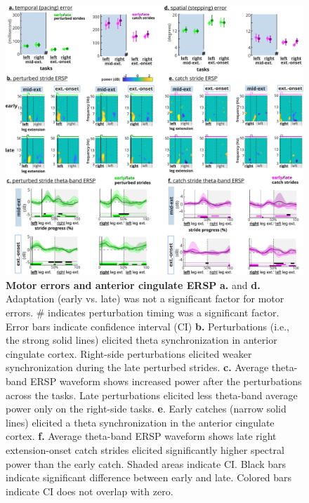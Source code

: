\documentclass[../thesis_seyed.tex]{subfiles}
\begin{document}
\begin{figure}[H]
\centerline{\includegraphics{../img/hyp1and2-fdr.jpg}}
\caption{\textbf{Motor errors and anterior cingulate ERSP} \textbf{a.} and \textbf{d.} Adaptation (early vs. late) was not a significant factor for motor errors. \# indicates perturbation timing was a significant factor. Error bars indicate confidence interval (CI) \textbf{b.} Perturbations (i.e., the strong solid lines) elicited theta synchronization in anterior cingulate cortex. Right-side perturbations elicited weaker synchronization during the late perturbed strides. \textbf{c.} Average theta-band ERSP waveform shows increased power after the perturbations across the tasks. Late perturbations elicited less theta-band average power only on the right-side tasks. \textbf{e}. Early catches (narrow solid lines) elicited a theta synchronization in the anterior cingulate cortex. \textbf{f.} Average theta-band ERSP waveform shows late right extension-onset catch strides elicited significantly higher spectral power than the early catch. Shaded areas indicate CI. Black bars indicate significant difference between early and late. Colored bars indicate CI does not overlap with zero.}
\label{fig:fig6}
\end{figure}
\end{document}
